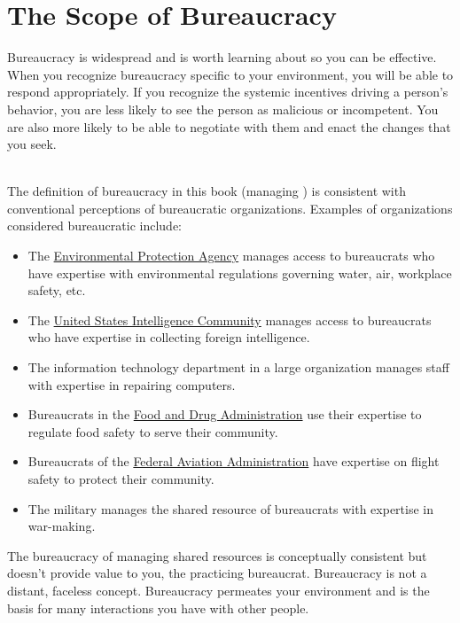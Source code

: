 \section{The Scope of Bureaucracy}
Bureaucracy is widespread and is worth learning about so you can be effective.  When you recognize bureaucracy specific to your environment, you will be able to respond appropriately. If you recognize the systemic incentives driving a person's behavior, you are less likely to see the person as malicious or incompetent. You are also more likely to be able to negotiate with them and enact the changes that you seek.

\ \\

The definition of bureaucracy in this book (managing 
\iftoggle{glossarysubstitutionworks}{\glspl{shared resource}}{shared resources}) 
is consistent with conventional perceptions of bureaucratic organizations. 
Examples of organizations considered bureaucratic include:
  \begin{itemize}
      \item The \href{https://www.epa.gov/}{Environmental Protection Agency} manages access to bureaucrats who have expertise with environmental regulations governing water, air, workplace safety, etc.
      \item The \href{https://www.intelligence.gov/}{United States Intelligence Community} manages access to bureaucrats who have expertise in collecting foreign intelligence.
      \item The information technology department in a large organization manages staff with expertise in repairing computers.%
      \item Bureaucrats in the \href{https://www.fda.gov/}{Food and Drug Administration} use their expertise to regulate food safety to serve their community.%
      \item Bureaucrats of the \href{https://www.faa.gov/}{Federal Aviation Administration} have expertise on flight safety to protect their community.%
      \item The military manages the shared resource of bureaucrats with expertise in war-making.
  \end{itemize}

The bureaucracy of managing shared resources is conceptually consistent but doesn't provide value to you, the practicing bureaucrat. Bureaucracy is not a distant, faceless concept. Bureaucracy permeates your environment and is the basis for many interactions you have with other people. 

